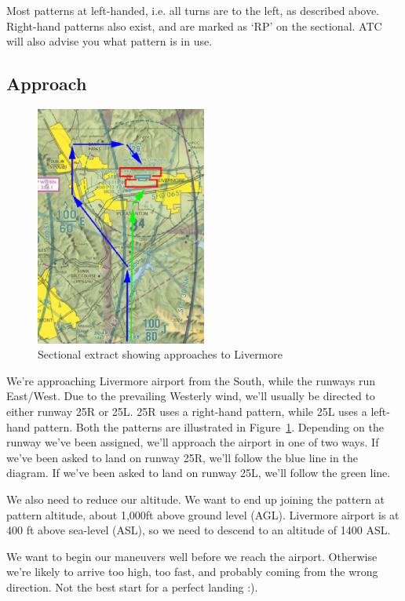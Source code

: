 Most patterns at left-handed, i.e. all turns are to the left, as described
above. Right-hand patterns also exist, and are marked as `RP' on the sectional.
ATC will also advise you what pattern is in use.

\subsection{Approach}

\begin{figure}[!htp]
\centering
\includegraphics[width=0.5\textwidth]{livermore_pattern3}
\caption{Sectional extract showing approaches to Livermore\label{approach}}
\end{figure}

We're approaching Livermore airport from the South, while the runways run East/West.
Due to the prevailing Westerly wind, we'll usually be directed to either
runway 25R or 25L. 25R uses a right-hand pattern, while 25L uses a left-hand pattern.
Both the patterns are illustrated in Figure~\ref{approach}.
Depending on the runway we've been assigned, we'll approach the airport in one of two ways.
If we've been asked to land on runway 25R, we'll follow the blue line in the diagram.
If we've been asked to land on runway 25L, we'll follow the green line.

We also need to reduce our altitude. We want to end up joining the pattern at pattern
altitude, about 1,000ft above ground level (AGL). Livermore airport is at 400 ft above
sea-level (ASL), so we need to descend to an altitude of 1400 ASL.

We want to begin our maneuvers well before we reach the airport.
Otherwise we're likely to arrive too high, too fast, and probably
coming from the wrong direction. Not the best start for a perfect landing :).

